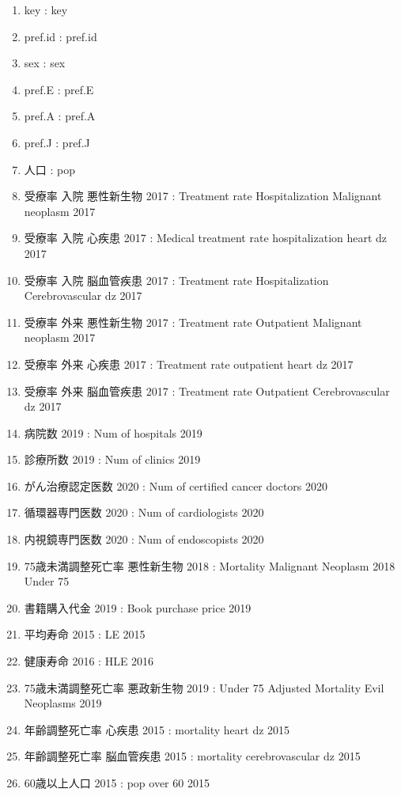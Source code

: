 \begin{multicols}{2}


\begin{enumerate}
  \item key  :  key
  \item pref.id  :  pref.id
  \item sex  :  sex
  \item pref.E  :  pref.E
  \item pref.A  :  pref.A
  \item pref.J  :  pref.J
  \item 人口  :  pop
  \item 受療率 入院 悪性新生物 2017  :  Treatment rate Hospitalization Malignant neoplasm 2017
  \item 受療率 入院 心疾患 2017  :  Medical treatment rate hospitalization heart dz 2017
  \item 受療率 入院 脳血管疾患 2017  :  Treatment rate Hospitalization Cerebrovascular dz 2017
  \item 受療率 外来 悪性新生物 2017  :  Treatment rate Outpatient Malignant neoplasm 2017
  \item 受療率 外来 心疾患 2017  :  Treatment rate outpatient heart dz 2017
  \item 受療率 外来 脳血管疾患 2017  :  Treatment rate Outpatient Cerebrovascular dz 2017
  \item 病院数 2019  :  Num of hospitals 2019
  \item 診療所数 2019  :  Num of clinics 2019
  \item がん治療認定医数 2020  :  Num of certified cancer doctors 2020
  \item 循環器専門医数 2020  :  Num of cardiologists 2020
  \item 内視鏡専門医数 2020  :  Num of endoscopists 2020
  \item 75歳未満調整死亡率 悪性新生物 2018  :  Mortality Malignant Neoplasm 2018 Under 75
  \item 書籍購入代金 2019  :  Book purchase price 2019
  \item 平均寿命 2015  :  LE 2015
  \item 健康寿命 2016  :  HLE 2016
  \item 75歳未満調整死亡率 悪政新生物 2019  :  Under 75 Adjusted Mortality Evil Neoplasms 2019
  \item 年齢調整死亡率 心疾患 2015  :  mortality heart dz 2015
  \item 年齢調整死亡率 脳血管疾患 2015  :  mortality cerebrovascular dz 2015
  \item 60歳以上人口 2015  :  pop over 60 2015

\end{enumerate}
\end{multicols}
